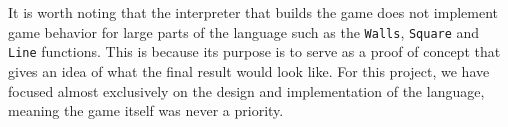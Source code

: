 It is worth noting that the interpreter that builds the game does not implement game behavior for large parts of the \dazel{} language such as the \texttt{Walls}, \texttt{Square} and \texttt{Line} functions. 
This is because its purpose is to serve as a proof of concept that gives an idea of what the final result would look like. 
For this project, we have focused almost exclusively on the design and implementation of the \dazel{} language, meaning the game itself was never a priority.
